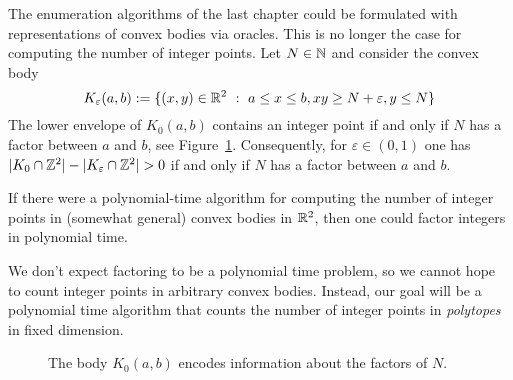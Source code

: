 The enumeration algorithms of the last chapter could be formulated with representations of convex bodies via oracles.
This is no longer the case for computing the number of integer points.
Let $N \in \mathbb{N}$ and consider the convex body
\[
  K_\varepsilon(a,b) := \{ (x,y) \in \mathbb{R}^2 ~:~ a \leq x \leq b, xy \geq N + \varepsilon, y \leq N \}
\]
The lower envelope of $K_0(a, b)$ contains an integer point if and only if $N$ has a factor between $a$ and $b$,
see Figure~\ref{fig:factoring-body}.
Consequently, for $\varepsilon \in (0,1)$ one has $|K_0 \cap \mathbb{Z}^2| - |K_\varepsilon \cap \mathbb{Z}^2| > 0$ if and only if $N$ has a factor between $a$ and $b$.
\begin{fact}
  If there were a polynomial-time algorithm for computing the number of integer points in (somewhat general) convex bodies in $\mathbb{R}^2$,
  then one could factor integers in polynomial time.
\end{fact}
We don't expect factoring to be a polynomial time problem,
so we cannot hope to count integer points in arbitrary convex bodies.
Instead, our goal will be a polynomial time algorithm that counts the number of integer points in \emph{polytopes}
in fixed dimension.

\begin{figure}
  \begin{center}
  \end{center}
  \caption{The body $K_0(a,b)$ encodes information about the factors of $N$.}
  \label{fig:factoring-body}
\end{figure}



